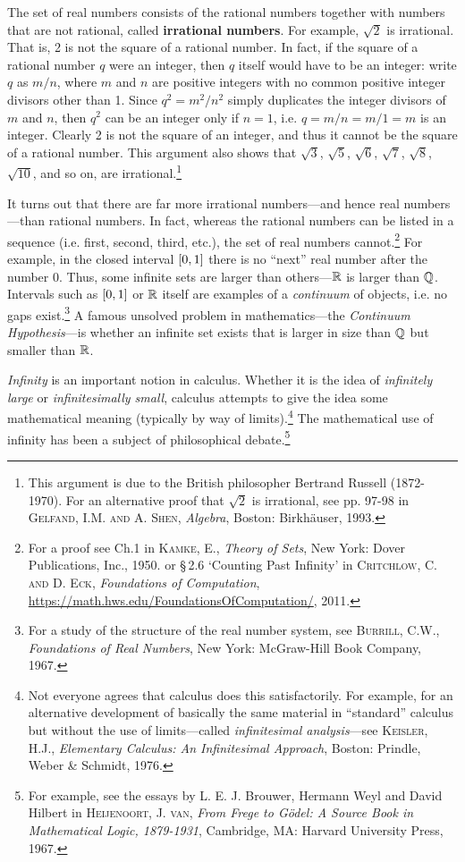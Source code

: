 The set of real numbers consists of the rational numbers together with numbers
that are not rational, called \textbf{irrational numbers}. For example, $\sqrt{2}$ is irrational. That is, 2 is not the square of
a rational number. In fact, if the square of a rational number $q$ were an
integer, then $q$ itself would have to be an integer: write $q$ as $m/n$, where
$m$ and $n$ are positive integers with no common positive integer divisors other
than 1. Since $q^2 = m^2/n^2$ simply duplicates the integer divisors of $m$ and
$n$, then $q^2$ can be an integer only if $n=1$, i.e. $q=m/n=m/1=m$ is an integer. Clearly
2 is not the square of an integer, and thus it cannot be the square of a
rational number. This argument also shows that $\sqrt{3}$, $\sqrt{5}$,
$\sqrt{6}$, $\sqrt{7}$, $\sqrt{8}$, $\sqrt{10}$, and so on, are
irrational.\footnote{This argument is due to the British philosopher Bertrand
Russell (1872-1970). For an alternative proof that $\sqrt{2}$ is irrational, see
pp. 97-98 in \textsc{Gelfand, I.M. and A. Shen}, \emph{Algebra}, Boston:
Birkh\"{a}user, 1993.}

It turns out that there are far more irrational numbers---and hence real
numbers---than rational numbers. In fact, whereas the rational numbers can be
listed in a sequence (i.e. first, second, third, etc.), the set of real numbers
cannot.\footnote{\label{footnote:dense-reals}For a proof see Ch.1 in \textsc{Kamke, E.}, \emph{Theory of
Sets}, New York: Dover Publications, Inc., 1950. or \S\,2.6 `Counting Past
Infinity' in \textsc{Critchlow, C. and D. Eck}, \emph{Foundations of Computation},
\url{https://math.hws.edu/FoundationsOfComputation/}, 2011.} For example, in the closed
interval $\lbrack 0,1 \rbrack$ there is no ``next'' real number after the number $0$.
Thus, some infinite sets are larger than others---$\mathbb{R}$ is larger than
$\mathbb{Q}$. Intervals such as $\lbrack 0,1 \rbrack$
or $\mathbb{R}$ itself are examples of a \emph{continuum} of objects, i.e. no
gaps exist.\footnote{For a study of the structure of the real number system, see
\textsc{Burrill, C.W.}, \emph{Foundations of Real Numbers}, New York:
McGraw-Hill Book Company, 1967.}
A famous unsolved problem in mathematics---the \emph{Continuum Hypothesis}---is
whether an infinite set exists that is larger in size than $\mathbb{Q}$ but
smaller than $\mathbb{R}$.

\emph{Infinity} is an important notion in calculus. Whether it is the idea
of \emph{infinitely large} or \emph{infinitesimally small}, calculus attempts to
give the idea some mathematical meaning (typically by way of
limits).\footnote{Not everyone agrees that calculus does this satisfactorily.
For example, for an alternative development of basically the same material
in ``standard'' calculus but without the use of limits---called
\emph{infinitesimal analysis}---see \textsc{Keisler, H.J.}, \emph{Elementary
Calculus: An Infinitesimal Approach}, Boston: Prindle, Weber \& Schmidt, 1976.}
The mathematical use of infinity has been a subject of philosophical
debate.\footnote{For example, see the essays by L. E. J. Brouwer, Hermann
Weyl and David Hilbert in \textsc{Heijenoort, J. van}, \emph{From Frege to
G{\"o}del: A Source Book in Mathematical Logic, 1879-1931}, Cambridge, MA:
Harvard University Press, 1967.}


